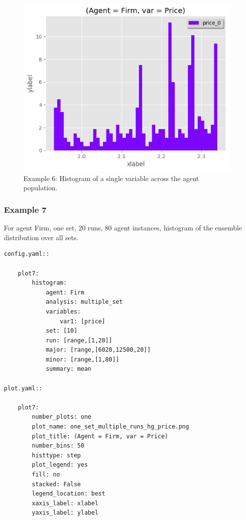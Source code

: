 \documentclass[10pt,a4paper]{article}
\begin{document}
\begin{figure}[b!]\centering\leavevmode
\includegraphics[scale=.7]{./plots_tut_2/one_set_one_run_hg_price_price.png}
\caption{\footnotesize  Example 6: Histogram of a single variable across the agent population.}
\end{figure}

\clearpage
\subsubsection{Example 7}
 For agent Firm, one set, 20 runs, 80 agent instances, histogram of the ensemble distribution over all sets.

\begin{lstlisting}
config.yaml::

    plot7:
        histogram:
            agent: Firm
            analysis: multiple_set
            variables:
                var1: [price]
            set: [10]
            run: [range,[1,20]]
            major: [range,[6020,12500,20]]
            minor: [range,[1,80]] 
            summary: mean

plot.yaml::

    plot7:
        number_plots: one
        plot_name: one_set_multiple_runs_hg_price.png
        plot_title: (Agent = Firm, var = Price)
        number_bins: 50
        histtype: step
        plot_legend: yes
        fill: no
        stacked: False
        legend_location: best
        xaxis_label: xlabel
        yaxis_label: ylabel
\end{lstlisting}
\end{document}
